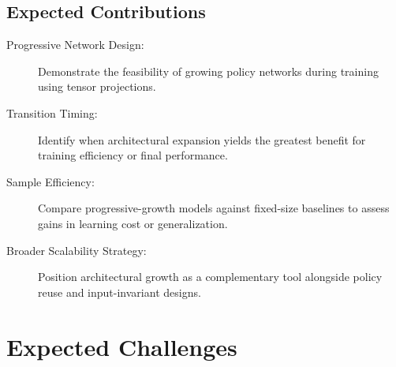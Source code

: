 \subsection{Expected Contributions}
\begin{description}
    \item[Progressive Network Design:] Demonstrate the feasibility of growing 
        policy networks during training using tensor projections.
    \item[Transition Timing:] Identify when architectural expansion yields the 
        greatest benefit for training efficiency or final performance.
    \item[Sample Efficiency:] Compare progressive-growth models against fixed-size 
        baselines to assess gains in learning cost or generalization.
    \item[Broader Scalability Strategy:] Position architectural growth as a 
        complementary tool alongside policy reuse and input-invariant designs.
\end{description}

\section{Expected Challenges}

